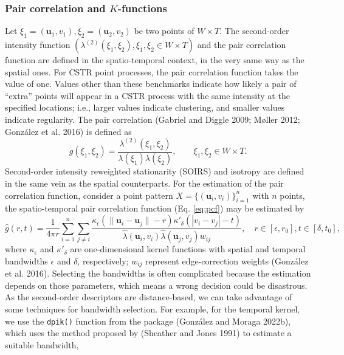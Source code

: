 \hypertarget{pair-correlation-and-k-functions-1}{%
\subsubsection{\texorpdfstring{Pair correlation and \(K\)-functions}{Pair correlation and K-functions}}\label{pair-correlation-and-k-functions-1}}

Let \(\xi_1 = (\mathbf{u}_1,v_1),\xi_2 = (\mathbf{u}_2,v_2)\) be two points of \(W\times T\). The second-order intensity function \((\lambda^{(2)}(\xi_1,\xi_2), \xi_1,\xi_2\in W\times T)\) and the pair correlation function are defined in the spatio-temporal context, in the very same way as the spatial ones. For CSTR point processes, the pair correlation function takes the value of one. Values other than these benchmarks indicate how likely a pair of ``extra'' points will appear in a CSTR process with the same intensity at the specified locations; i.e., larger values indicate clustering, and smaller values indicate regularity. The pair correlation (Gabriel and Diggle 2009; Møller 2012; González et al. 2016) is defined as
\begin{equation}
    g(\xi_1,\xi_2)=\frac{\lambda^{(2)}(\xi_1,\xi_2)}{\lambda(\xi_1)\lambda(\xi_2)}, \qquad \xi_1,\xi_2\in W\times T.
    \label{eq:pcf}
\end{equation}
Second-order intensity reweighted stationarity (SOIRS) and isotropy are defined in the same vein as the spatial counterparts. For the estimation of the pair correlation function, consider a point pattern \(X=\{(\mathbf{u}_{i},v_i)\}_{i=1}^n\) with \(n\) points, the spatio-temporal pair correlation function (Eq. \eqref{eq:pcf}) may be estimated by
\[
    \hat{g}(r,t)=\frac{1}{4\pi r}
    \sum_{i=1}^n \sum_{j\neq i}
    \frac{\kappa_{\epsilon}(\|\mathbf{u}_{i}-\mathbf{u}_{j}\|- r)\kappa'_{\delta}(|v_{i}-v_{j}|-t)}{\hat{\lambda} \left( \mathbf{u}_{i},v_{i}\right) \hat{\lambda} \left(\mathbf{u}_{j},v_{j}\right) w_{ij}
    }, \quad r \in [\epsilon, r_0], t\in [\delta, t_0],
\]
where \(\kappa_{\epsilon}\) and \(\kappa'_{\delta}\) are one-dimensional kernel functions with spatial and temporal bandwidths \(\epsilon\) and \(\delta\), respectively; \(w_{ij}\) represent edge-correction weights (González et al. 2016). Selecting the bandwidths is often complicated because the estimation depends on those parameters, which means a wrong decision could be disastrous. As the second-order descriptors are distance-based, we can take advantage of some techniques for bandwidth selection. For example, for the temporal kernel, we use the \texttt{dpik()} function from the  package (González and Moraga 2022b), which uses the method proposed by (Sheather and Jones 1991) to estimate a suitable bandwidth,

